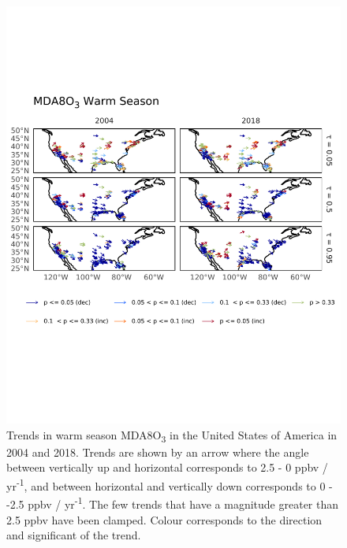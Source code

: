 \documentclass[journal abbreviation, manuscript]{copernicus}
\begin{document}
\begin{figure}[p]
\centering
\includegraphics[height=0.9\textheight]{figures/paper_figures/f06_o3_map_mda8_warm_us_o3.pdf}
\caption{Trends in warm season MDA8O\textsubscript{3} in the United States of America in 2004 and 2018. Trends are shown by an arrow where the angle between vertically up and horizontal corresponds to 2.5 - 0 ppbv / yr\textsuperscript{-1}, and between horizontal and vertically down corresponds to 0 - -2.5 ppbv / yr\textsuperscript{-1}. The few trends that have a magnitude greater than 2.5 ppbv have been clamped. Colour corresponds to the direction and significant of the trend.}
\label{fig:o3_map_us_mda8_warm}
\end{figure}
\clearpage


\end{document}
